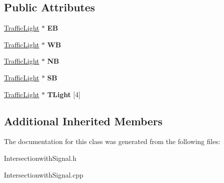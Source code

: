 \subsection*{Public Attributes}
\begin{DoxyCompactItemize}
\item 
\hypertarget{class_intersectionwith_signal_a8a57308329169b7c05acdeabfaa74206}{\hyperlink{class_traffic_light}{Traffic\-Light} $\ast$ {\bfseries E\-B}}\label{class_intersectionwith_signal_a8a57308329169b7c05acdeabfaa74206}

\item 
\hypertarget{class_intersectionwith_signal_a5f321e72c10bb5a4ebeb6d314135fdbb}{\hyperlink{class_traffic_light}{Traffic\-Light} $\ast$ {\bfseries W\-B}}\label{class_intersectionwith_signal_a5f321e72c10bb5a4ebeb6d314135fdbb}

\item 
\hypertarget{class_intersectionwith_signal_af548458cb3fbe82d25a13fd9295406f7}{\hyperlink{class_traffic_light}{Traffic\-Light} $\ast$ {\bfseries N\-B}}\label{class_intersectionwith_signal_af548458cb3fbe82d25a13fd9295406f7}

\item 
\hypertarget{class_intersectionwith_signal_a19a6f5316f7d0ec4c08e6f80126b3e6c}{\hyperlink{class_traffic_light}{Traffic\-Light} $\ast$ {\bfseries S\-B}}\label{class_intersectionwith_signal_a19a6f5316f7d0ec4c08e6f80126b3e6c}

\item 
\hypertarget{class_intersectionwith_signal_a2c5e8c7432419eac922f8efa01a2f487}{\hyperlink{class_traffic_light}{Traffic\-Light} $\ast$ {\bfseries T\-Light} \mbox{[}4\mbox{]}}\label{class_intersectionwith_signal_a2c5e8c7432419eac922f8efa01a2f487}

\end{DoxyCompactItemize}
\subsection*{Additional Inherited Members}


The documentation for this class was generated from the following files\-:\begin{DoxyCompactItemize}
\item 
Intersectionwith\-Signal.\-h\item 
Intersectionwith\-Signal.\-cpp\end{DoxyCompactItemize}
